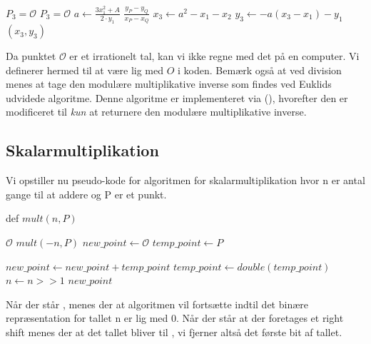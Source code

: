 \begin{algorithmic}

    \State \Return $P_3 = \mathcal{O}$
    \EndIf
{}
    \State \Return $P_3 = \mathcal{O}$
    \EndIf
{}
    \State $a \gets \frac{3x_{1}^2+A}{2\cdot y_{1}}$
\Else
    \State $\frac{y_{P}-y_{Q}}{x_{P}-x_{Q}}$
\EndIf
\State $x_3 \gets a^2 - x_1 - x_2$
\State $y_3 \gets -a(x_{3}- x_1 )- y_1$
\State \Return $(x_3, y_3)$

\end{algorithmic}

Da punktet $\mathcal{O}$ er et irrationelt tal, kan vi ikke regne med det på en computer. Vi definerer hermed  til at være lig med $O$ i koden. Bemærk også at ved division menes at tage den modulære multiplikative inverse som findes ved Euklids udvidede algoritme. Denne algoritme er implementeret via (\cite{andrewharrington}), hvorefter den er modificeret til \textit{kun} at returnere den modulære multiplikative inverse.

\subsection{Skalarmultiplikation}
\label{sec:skalarmultiplikation}
Vi opstiller nu pseudo-kode for algoritmen for skalarmultiplikation hvor n er antal gange til at addere og P er et punkt.
\\
\begin{algorithmic}
    \State def $mult(n, P)$

        
        \State \Return $\mathcal{O}$
        \State \Return $mult(-n, P)$ 
    \EndIf
    \State $new\_point \gets \mathcal{O}$
    \State $temp\_point \gets P$

     
         
        \State $new\_point \gets new\_point + temp\_point$
        \EndIf
        \State $temp\_point \gets double(temp\_point)$ 
        \State $n \gets n>>1$ 
    \EndWhile
    \State \Return $new\_point$
\end{algorithmic}

Når der står , menes der at algoritmen vil fortsætte indtil det binære repræsentation for tallet n er lig med 0. Når der står at der foretages et right shift menes der at det tallet  bliver til , vi fjerner altså det første bit af tallet. 


